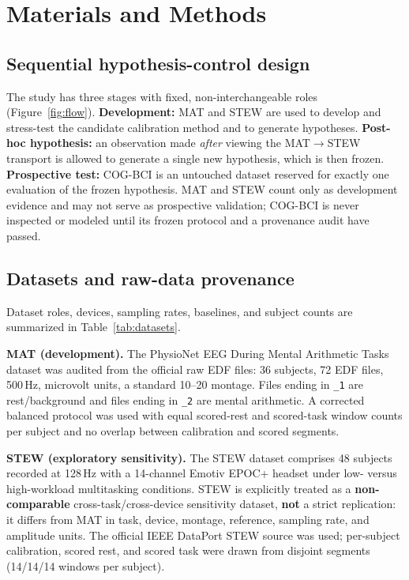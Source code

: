\documentclass[11pt]{article}
\begin{document}
\section{Materials and Methods}

\subsection{Sequential hypothesis-control design}

The study has three stages with fixed, non-interchangeable roles
(Figure~\ref{fig:flow}). \textbf{Development:} MAT and STEW are used to develop
and stress-test the candidate calibration method and to generate hypotheses.
\textbf{Post-hoc hypothesis:} an observation made \textit{after} viewing the
MAT$\rightarrow$STEW transport is allowed to generate a single new hypothesis,
which is then frozen. \textbf{Prospective test:} COG-BCI is an untouched
dataset reserved for exactly one evaluation of the frozen hypothesis. MAT and
STEW count only as development evidence and may not serve as prospective
validation; COG-BCI is never inspected or modeled until its frozen protocol and
a provenance audit have passed.

\subsection{Datasets and raw-data provenance}

Dataset roles, devices, sampling rates, baselines, and subject counts are
summarized in Table~\ref{tab:datasets}.

\textbf{MAT (development).} The PhysioNet EEG During Mental Arithmetic Tasks
dataset \cite{physionet_eegmat, zyma2019, goldberger2000} was audited from the
official raw EDF files: 36 subjects, 72 EDF files, 500\,Hz, microvolt units, a
standard 10--20 montage. Files ending in \texttt{\_1} are rest/background and
files ending in \texttt{\_2} are mental arithmetic. A corrected balanced
protocol was used with equal scored-rest and scored-task window counts per
subject and no overlap between calibration and scored segments.

\textbf{STEW (exploratory sensitivity).} The STEW dataset
\cite{stew_dataset} comprises 48 subjects recorded at 128\,Hz with a 14-channel
Emotiv EPOC+ headset under low- versus high-workload multitasking conditions.
STEW is explicitly treated as a \textbf{non-comparable} cross-task/cross-device
sensitivity dataset, \textbf{not} a strict replication: it differs from MAT in
task, device, montage, reference, sampling rate, and amplitude units. The
official IEEE DataPort STEW source was used; per-subject calibration, scored
rest, and scored task were drawn from disjoint segments (14/14/14 windows per
subject).
\end{document}
